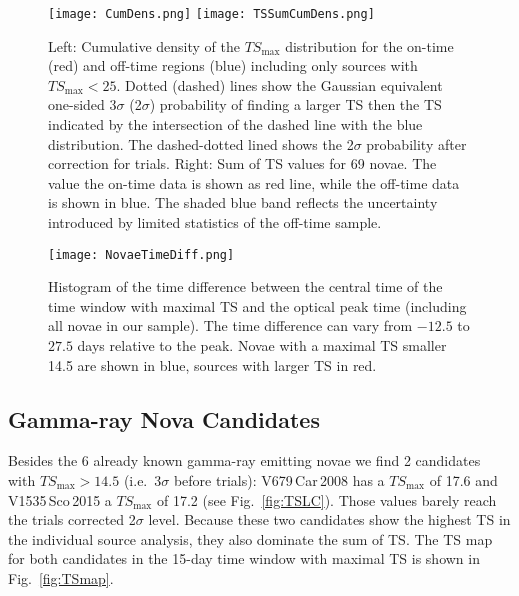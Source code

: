 \documentclass{aa} %
\begin{document}
\begin{figure*}[htb!]
\begin{center}
\texttt{[image: CumDens.png]}
\texttt{[image: TSSumCumDens.png]}
\noindent
\caption{\small Left: Cumulative density of the $TS_{\textrm{max}}$ distribution for the on-time (red) and off-time regions (blue) including only sources with $TS_{\textrm{max}} <25$. Dotted (dashed) lines show the Gaussian equivalent one-sided 3$\sigma$ (2$\sigma$) probability of finding a larger TS then the TS indicated by the intersection of the dashed line with the blue distribution. The dashed-dotted lined shows the 2$\sigma$ probability after correction for trials. Right: Sum of TS values for 69 novae. The value the on-time data is shown as red line, while the off-time data is shown in blue. The shaded blue band reflects the uncertainty introduced by limited statistics of the off-time sample.}
\label{fig:TSDist}
\end{center}
\end{figure*}


\begin{figure}[htb!]
\begin{center}
\texttt{[image: NovaeTimeDiff.png]}
\noindent
\caption{\small Histogram of the time difference between the central time of the time window with maximal TS and the optical peak time (including all novae in our sample). The time difference can vary from $-12.5$ to $27.5$ days relative to the peak. Novae with a maximal TS smaller 14.5 are shown in blue, sources with larger TS in red.}
\label{fig:TimeDiff}
\end{center}
\end{figure}


\subsection{Gamma-ray Nova Candidates}
\label{subsec:novaCand}
Besides the 6 already known gamma-ray emitting novae we find 2 candidates with $TS_{\textrm{max}} > 14.5$ (i.e.~3$\sigma$ before trials): V679\,Car\,2008 has a $TS_{\textrm{max}}$ of 17.6 and
V1535\,Sco\,2015 a $TS_{\textrm{max}}$ of 17.2 (see Fig.~\ref{fig:TSLC}). Those values barely reach the trials corrected 2$\sigma$ level. Because these two candidates show the highest TS in the individual source analysis, they also dominate the sum of TS. The TS map for both candidates in the 15-day time window with maximal TS is shown in Fig.~\ref{fig:TSmap}. 
\end{document}
